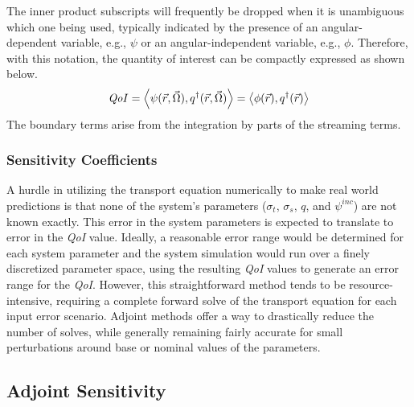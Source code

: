 \documentclass[12pt]{report}
\newcommand{\vr}{\vec{r}}
\newcommand{\vO}{\vec{\Omega}}
\newcommand{\bra}{\left\langle}
\newcommand{\ket}{\right\rangle}
\newcommand{\sigt}{\sigma_t}
\newcommand{\sigs}{\sigma_s}
\newcommand{\angResp}{q^\dag}
\newcommand{\scalResp}{q^\dag}
\newcommand{\qoi}{{\it QoI}\xspace}
\begin{document}
The inner product subscripts will frequently be dropped when it is unambiguous which one being used, typically indicated by the presence of an angular-dependent variable, e.g., $\psi$ or an angular-independent variable, e.g., $\phi$. Therefore, with this notation, the quantity of interest can be compactly expressed as shown below.
\begin{equation}
\label{QoIDef}
\qoi = \bra \psi(\vr,\vO), \angResp(\vr,\vO) \ket  = \bra \phi(\vr) , \scalResp(\vr) \ket
\end{equation}
The boundary terms arise from the integration by parts of the streaming terms.

\subsubsection{Sensitivity Coefficients}
A hurdle in utilizing the transport equation numerically to make real world predictions is that none of the system's parameters ($\sigt$, $\sigs$, $q$, and $\psi^{inc}$) are not known exactly. This error in the system parameters is expected to translate to error in the \qoi value. Ideally, a reasonable error range would be determined for each system parameter and the system simulation would run over a finely discretized parameter space, using the resulting \qoi values to generate an error range for the \qoi. However, this straightforward method tends to be resource-intensive, requiring a complete forward solve of the transport equation for each input error scenario. Adjoint methods offer a way to drastically reduce the number of solves, while generally remaining fairly accurate for small perturbations around base or nominal values of the parameters.


\subsection{Adjoint Sensitivity}
\end{document}

